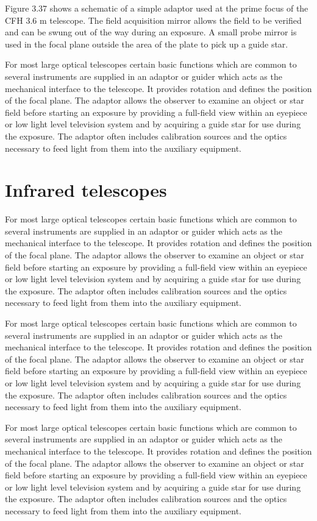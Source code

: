 Figure 3.37 shows a schematic of a simple adaptor used at the prime
focus of the CFH 3.6 m telescope. The field acquisition mirror
allows the field to be verified and can be swung out of the way during
an exposure. A small probe mirror is used in the focal plane outside
the area of the plate to pick up a guide star.

For most large optical telescopes certain basic functions
which are common to several instruments are supplied in an adaptor or
guider which acts as the mechanical interface to the telescope. It
provides rotation and defines the position of the focal plane. The
adaptor allows the observer to examine an object or star field before
starting an exposure by providing a full-field view within an eyepiece
or low light level television system and by acquiring a guide star for
use during the exposure. The adaptor often includes calibration sources
and the optics necessary to feed light from them into the auxiliary
equipment.

\section{Infrared telescopes}

For most large optical telescopes certain basic functions which
are common to several instruments are supplied in an adaptor or guider
which acts as the mechanical interface to the telescope. It provides
rotation and defines the position of the focal plane. The adaptor allows
the observer to examine an object or star field before starting an
exposure by providing a full-field view within an eyepiece or low light
level television system and by acquiring a guide star for use during
the exposure. The adaptor often includes calibration sources and the
optics necessary to feed light from them into the auxiliary equipment.

For most large optical telescopes certain basic functions which are
common to several instruments are supplied in an adaptor or guider which
acts as the mechanical interface to the telescope. It provides rotation
and defines the position of the focal plane. The adaptor allows the
observer to examine an object or star field before starting an exposure
by providing a full-field view within an eyepiece or low light level
television system and by acquiring a guide star for use during the
exposure. The adaptor often includes calibration sources and the optics
necessary to feed light from them into the auxiliary equipment.

For most large optical telescopes certain basic functions which are
common to several instruments are supplied in an adaptor or guider which
acts as the mechanical interface to the telescope. It provides rotation
and defines the position of the focal plane. The adaptor allows the
observer to examine an object or star field before starting an exposure
by providing a full-field view within an eyepiece or low light level
television system and by acquiring a guide star for use during the
exposure. The adaptor often includes calibration sources and the optics
necessary to feed light from them into the auxiliary equipment.

